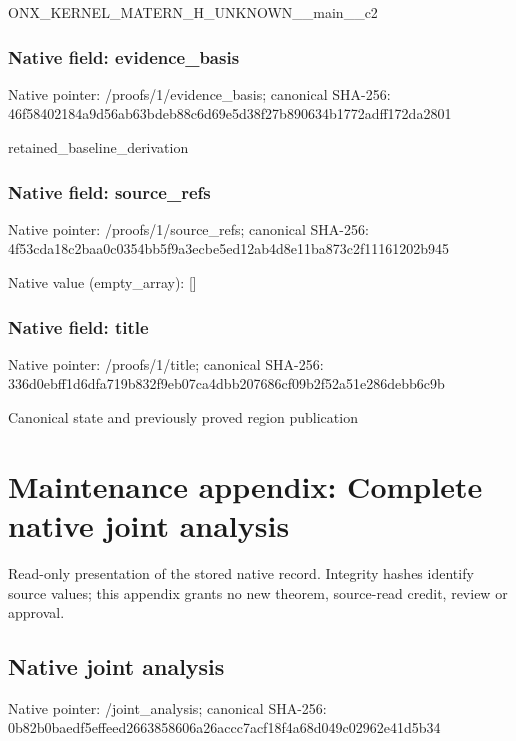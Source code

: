 \documentclass[10pt,a4paper]{article}
\begin{document}
\begingroup\raggedright\sloppy ONX\_\allowbreak{}KERNEL\_\allowbreak{}MATERN\_\allowbreak{}H\_\allowbreak{}UNKNOWN\_\allowbreak{}\_\allowbreak{}main\_\allowbreak{}\_\allowbreak{}c2\par\endgroup

\subsubsection{Native field: evidence\_\allowbreak{}basis}
Native pointer: /proofs/1/evidence\_\allowbreak{}basis; canonical SHA-256: 46f58402184a9d56ab63bdeb88c6d69e5d38f27b890634b1772adff172da2801

\begingroup\raggedright\sloppy retained\_\allowbreak{}baseline\_\allowbreak{}derivation\par\endgroup

\subsubsection{Native field: source\_\allowbreak{}refs}
Native pointer: /proofs/1/source\_\allowbreak{}refs; canonical SHA-256: 4f53cda18c2baa0c0354bb5f9a3ecbe5ed12ab4d8e11ba873c2f11161202b945

Native value (empty\_\allowbreak{}array): []

\subsubsection{Native field: title}
Native pointer: /proofs/1/title; canonical SHA-256: 336d0ebff1d6dfa719b832f9eb07ca4dbb207686cf09b2f52a51e286debb6c9b

\begingroup\raggedright\sloppy Canonical state and previously proved region publication\par\endgroup

\section{Maintenance appendix: Complete native joint analysis}
Read-only presentation of the stored native record. Integrity hashes identify source values; this appendix grants no new theorem, source-read credit, review or approval.

\subsection{Native joint analysis}
Native pointer: /joint\_\allowbreak{}analysis; canonical SHA-256: 0b82b0baedf5effeed2663858606a26accc7acf18f4a68d049c02962e41d5b34
\end{document}
